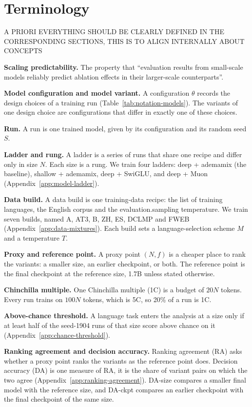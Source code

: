 \section{Terminology}

A PRIORI EVERYTHING SHOULD BE CLEARLY DEFINED IN THE CORRESPONDING SECTIONS, THIS IS TO ALIGN INTERNALLY ABOUT CONCEPTS

\textbf{Scaling predictability.} The property that ``evaluation results from small-scale models reliably predict ablation effects in their larger-scale counterparts''.

\textbf{Model configuration and model variant.} A configuration $\theta$ records the design choices of a training run (Table~\ref{tab:notation-models}). The variants of one design choice are configurations that differ in exactly one of these choices.

\textbf{Run.} A run is one trained model, given by its configuration and its random seed $S$.

\textbf{Ladder and rung.} A ladder is a series of runs that share one recipe and differ only in size $N$. Each size is a rung. We train four ladders: deep + ademamix (the baseline), shallow + ademamix, deep + SwiGLU, and deep + Muon (Appendix~\ref{app:model-ladder}).

\textbf{Data build.} A data build is one training-data recipe: the list of training languages, the English corpus and the evaluation.sampling temperature. We train seven builds, named A, AT3, B, ZH, ES, DCLMP and FWEB (Appendix~\ref{app:data-mixtures}). Each build sets a language-selection scheme $M$ and a temperature $T$.

\textbf{Proxy and reference point.} A proxy point $(N, f)$ is a cheaper place to rank the variants: a smaller size, an earlier checkpoint, or both. The reference point is the final checkpoint at the reference size, 1.7B unless stated otherwise.

\textbf{Chinchilla multiple.} One Chinchilla multiple (1C) is a budget of $20N$ tokens. Every run trains on $100N$ tokens, which is 5C, so 20\% of a run is 1C.

\textbf{Above-chance threshold.} A language task enters the analysis at a size only if at least half of the seed-1904 runs of that size score above chance on it (Appendix~\ref{app:chance-threshold}).

\textbf{Ranking agreement and decision accuracy.} Ranking agreement (RA) asks whether a proxy point ranks the variants as the reference point does. Decision accuracy (DA) is one measure of RA, it is the share of variant pairs on which the two agree (Appendix~\ref{app:ranking-agreement}). DA-size compares a smaller final model with the reference size, and DA-ckpt compares an earlier checkpoint with the final checkpoint of the same size.
